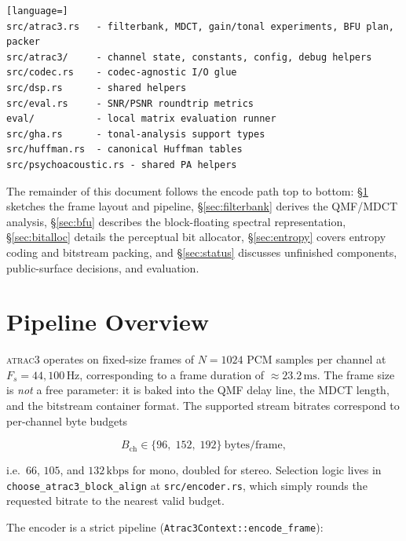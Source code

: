 \documentclass[11pt]{article}
\begin{document}
\begin{lstlisting}[language=]
src/atrac3.rs   - filterbank, MDCT, gain/tonal experiments, BFU plan, packer
src/atrac3/     - channel state, constants, config, debug helpers
src/codec.rs    - codec-agnostic I/O glue
src/dsp.rs      - shared helpers
src/eval.rs     - SNR/PSNR roundtrip metrics
eval/           - local matrix evaluation runner
src/gha.rs      - tonal-analysis support types
src/huffman.rs  - canonical Huffman tables
src/psychoacoustic.rs - shared PA helpers
\end{lstlisting}

The remainder of this document follows the encode path top to bottom:
\S\ref{sec:pipeline} sketches the frame layout and pipeline,
\S\ref{sec:filterbank} derives the QMF/MDCT analysis,
\S\ref{sec:bfu} describes the block-floating spectral representation,
\S\ref{sec:bitalloc} details the perceptual bit allocator,
\S\ref{sec:entropy} covers entropy coding and bitstream packing, and
\S\ref{sec:status} discusses unfinished components, public-surface decisions,
and evaluation.

\section{Pipeline Overview}
\label{sec:pipeline}

\textsc{atrac3} operates on fixed-size frames of \(N{=}1024\) PCM samples per
channel at \(F_s{=}44{,}100\,\text{Hz}\), corresponding to a frame duration of
\(\approx 23.2\,\text{ms}\). The frame size is \emph{not} a free parameter: it
is baked into the QMF delay line, the MDCT length, and the bitstream
container format. The supported stream bitrates correspond to per-channel
byte budgets

\begin{equation}
    B_{\text{ch}} \in \{96,\; 152,\; 192\}\ \text{bytes/frame},
\end{equation}

\noindent
i.e.\ \(66\), \(105\), and \(132\,\text{kbps}\) for mono, doubled for stereo.
Selection logic lives in \texttt{choose\_atrac3\_block\_align} at
\texttt{src/encoder.rs}, which simply rounds the requested bitrate to the
nearest valid budget.

The encoder is a strict pipeline (\texttt{Atrac3Context::encode\_frame}):
\end{document}

